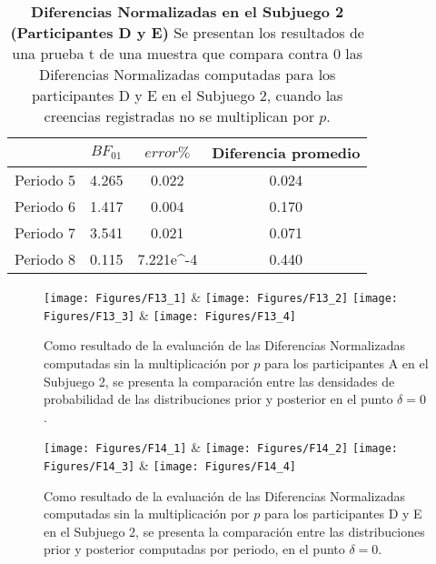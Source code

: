 \begin{table}[h]
\caption[Diferencias Normalizadas en el Subjuego 2, omitiendo la multiplicación por $p$; Participantes D y E (Pruebas t de una muestra)]{\textbf{Diferencias Normalizadas en el Subjuego 2 (Participantes D y E)} Se presentan los resultados de una prueba t de una muestra que compara contra 0 las Diferencias Normalizadas computadas para los participantes D y E en el Subjuego 2, cuando las creencias registradas no se multiplican por $p$.}
\label{DNnop-S2-DyE-B}
\centering
\begin{tabular}{l | c c | c}
\toprule
\textbf{} & \textbf{$BF_{01}$} & \textbf{$error\%$} & \textbf{Diferencia promedio}\\
\midrule
Periodo 5 & 4.265 & 0.022 & 0.024\\
Periodo 6 & 1.417 & 0.004 & 0.170\\
Periodo 7 & 3.541 & 0.021 & 0.071\\
Periodo 8 & 0.115 & 7.221e^-4 & 0.440\\
\bottomrule
\end{tabular}
\end{table}
 

\begin{figure}[h]
\centering
\texttt{[image: Figures/F13\_1]} & \texttt{[image: Figures/F13\_2]} 
\texttt{[image: Figures/F13\_3]} & \texttt{[image: Figures/F13\_4]} 
\decoRule
\caption[Evaluación de las Diferencias Normalizadas entre creencias (sin multiplicar por $p$) y elecciones en los participantes A en el Subjuego 2 (Factor de Bayes)]{Como resultado de la evaluación de las Diferencias Normalizadas computadas sin la multiplicación por $p$ para los participantes A en el Subjuego 2, se presenta la comparación entre las densidades de probabilidad de las distribuciones prior y posterior en el punto $\delta = 0$.}
\label{fig:DNnop_S2_A}
\end{figure}  


\begin{figure}[h]
\centering
\texttt{[image: Figures/F14\_1]} & \texttt{[image: Figures/F14\_2]} 
\texttt{[image: Figures/F14\_3]} & \texttt{[image: Figures/F14\_4]} 
\decoRule
\caption[Evaluación de las Diferencias Normalizadas entre creencias y elecciones en los participantes D y E en el Subjuego 2 (Factor de Bayes)]{Como resultado de la evaluación de las Diferencias Normalizadas computadas sin la multiplicación por $p$ para los participantes D y E en el Subjuego 2, se presenta la comparación entre las distribuciones prior y posterior computadas por periodo, en el punto $\delta = 0$.}
\label{fig:DNnop_S2_DyE}
\end{figure}  


